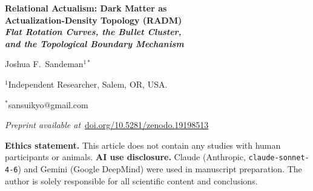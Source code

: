 \documentclass[11pt,a4paper]{article}
\theoremstyle{plain}
\theoremstyle{definition}
\theoremstyle{remark}
\begin{document}
\begin{center}
  {\LARGE\bfseries Relational Actualism: Dark Matter as\\
  Actualization-Density Topology (RADM)\\[4pt]
  \large\itshape Flat Rotation Curves, the Bullet Cluster,\\
  and the Topological Boundary Mechanism\par}
  \vspace{14pt}
  {\large Joshua F.\ Sandeman$^{1*}$\par}
  \vspace{4pt}
  {\normalsize $^{1}$Independent Researcher, Salem, OR, USA.\par}
  {\normalsize $^{*}$sansuikyo@gmail.com\par}
  \vspace{8pt}
  {\small\textit{Preprint available at}~\href{https://doi.org/10.5281/zenodo.19198513}{doi.org/10.5281/zenodo.19198513}\par}
  \vspace{14pt}
\end{center}
\noindent\textbf{Ethics statement.}
This article does not contain any studies with human participants or animals.
\medskip
\noindent\textbf{AI use disclosure.}
Claude (Anthropic, \texttt{claude-sonnet-4-6}) and Gemini (Google DeepMind)
were used in manuscript preparation. The author is solely responsible for all
scientific content and conclusions.
\medskip
\end{document}
